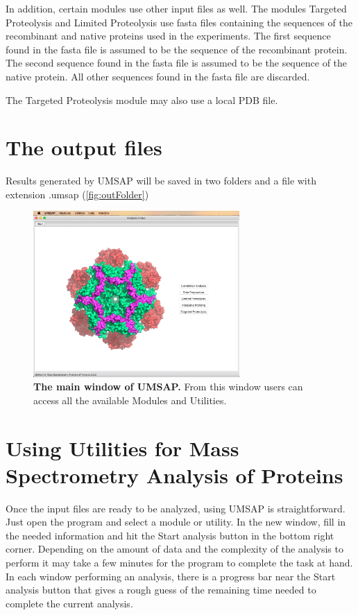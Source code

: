 In addition, certain modules use other input files as well. The modules Targeted
Proteolysis and Limited Proteolysis use fasta files containing the sequences of
the recombinant and native proteins used in the experiments. The first sequence
found in the fasta file is assumed to be the sequence of the recombinant protein.
The second sequence found in the fasta file is assumed to be the sequence of the
native protein. All other sequences found in the fasta file are discarded.

The Targeted Proteolysis module may also use a local PDB file. 

\section{The output files}
\label{sec:outFile}

Results generated by UMSAP will be saved in two folders and a file with extension
.umsap (\autoref{fig:outFolder}) 

\begin{figure}[h]
	\centering
	\includegraphics[width=0.7\textwidth]{./IMAGES/MAIN-WINDOW/mainwindow.jpg}
	\caption[The main window of UMSAP]{\textbf{The main window of UMSAP.} From
this window users can access all the available Modules and Utilities.} 
	\label{fig:outFolder}
	\vspace{-5pt}
\end{figure}

\section{Using Utilities for Mass Spectrometry Analysis of Proteins}

Once the input files are ready to be analyzed, using UMSAP is straightforward. Just open the program and select a module or utility. In the new window, fill in the needed information and hit the Start analysis button in the bottom right corner. Depending on the amount of data and the complexity of the analysis to perform it may take a few minutes for the program to complete the task at hand. In each window performing an analysis, there is a progress bar near the Start analysis button that gives a rough guess of the remaining time needed to complete the current analysis.

